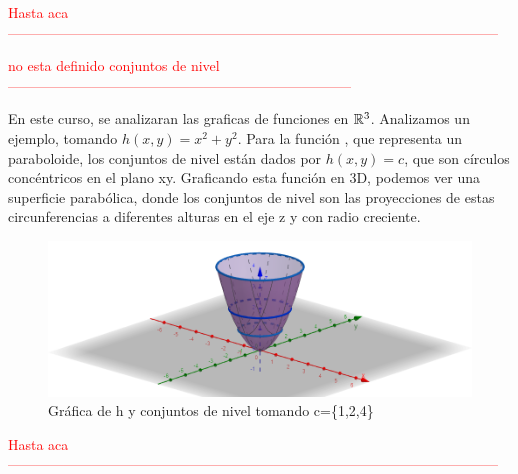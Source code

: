 \textcolor{red}{Hasta aca---------------------------------------------------------------------------------------------------------}

\vspace{1 cm}

\textcolor{red}{no esta definido conjuntos de nivel --------------------------------------------------------------------------}


En este curso, se analizaran las graficas de funciones en  $\mathbb{R}^3$. Analizamos un ejemplo, tomando $h(x,y)=x^2+y^2$.
Para la función , que representa un paraboloide, los conjuntos de nivel están dados por $h(x,y)=c$, que son círculos concéntricos en el plano xy. Graficando esta función en 3D, podemos ver una superficie parabólica, donde los conjuntos de nivel son las proyecciones de estas circunferencias a diferentes alturas en el eje z y con radio creciente.
\begin{figure}[h!] %
    \centering
    \includegraphics[width=1\textwidth]{../figs/r3_grafica.png} %
    \caption{\small{ Gráfica de h y conjuntos de nivel tomando 
    c=\{1,2,4}\}}
    \label{fig:ejemplo3} %
\end{figure}


\textcolor{red}{Hasta aca---------------------------------------------------------------------------------------------------------}

